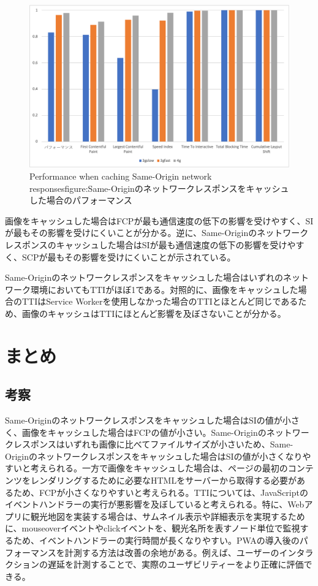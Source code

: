 \begin{multicols*}{2}
\begin{figure}
\end{figure}
\begin{figure}
  \centering
  \includegraphics[width=\textwidth]{images/service_worker_cache_same_origin.png}
  {Performance when caching Same-Origin network responses}{figure:Same-Originのネットワークレスポンスをキャッシュした場合のパフォーマンス}
\end{figure}
画像をキャッシュした場合はFCPが最も通信速度の低下の影響を受けやすく、SIが最もその影響を受けにくいことが分かる。逆に、Same-Originのネットワークレスポンスのキャッシュした場合はSIが最も通信速度の低下の影響を受けやすく、SCPが最もその影響を受けにくいことが示されている。

Same-Originのネットワークレスポンスをキャッシュした場合はいずれのネットワーク環境においてもTTIがほぼ1である。対照的に、画像をキャッシュした場合のTTIはService Workerを使用しなかった場合のTTIとほとんど同じであるため、画像のキャッシュはTTIにほとんど影響を及ぼさないことが分かる。

\section{まとめ}
\subsection{考察}
Same-Originのネットワークレスポンスをキャッシュした場合はSIの値が小さく、画像をキャッシュした場合はFCPの値が小さい。Same-Originのネットワークレスポンスはいずれも画像に比べてファイルサイズが小さいため、Same-Originのネットワークレスポンスをキャッシュした場合はSIの値が小さくなりやすいと考えられる。一方で画像をキャッシュした場合は、ページの最初のコンテンツをレンダリングするために必要なHTMLをサーバーから取得する必要があるため、FCPが小さくなりやすいと考えられる。TTIについては、JavaScriptのイベントハンドラーの実行が悪影響を及ぼしていると考えられる。特に、Webアプリに観光地図を実装する場合は、サムネイル表示や詳細表示を実現するために、mouseoverイベントやclickイベントを、観光名所を表すノード単位で監視するため、イベントハンドラーの実行時間が長くなりやすい。PWAの導入後のパフォーマンスを計測する方法は改善の余地がある。例えば、ユーザーのインタラクションの遅延を計測することで、実際のユーザビリティーをより正確に評価できる。


\end{multicols*}
